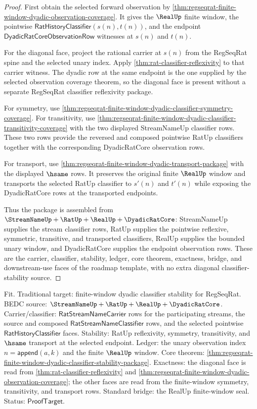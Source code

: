 \begin{proof}
First obtain the selected forward observation by
\autoref{thm:regseqrat-finite-window-dyadic-observation-coverage}. It gives
the $\RealUp$ finite window, the pointwise
$\mathsf{RatHistoryClassifier}(s(n),t(n))$, and the endpoint
$\mathsf{DyadicRatCoreObservationRow}$ witnesses at $s(n)$ and $t(n)$.

For the diagonal face, project the rational carrier at $s(n)$ from the
RegSeqRat spine and the selected unary index. Apply
\autoref{thm:rat-classifier-reflexivity} to that carrier witness. The dyadic
row at the same endpoint is the one supplied by the selected observation
coverage theorem, so the diagonal face is present without a separate
RegSeqRat classifier reflexivity package.

For symmetry, use
\autoref{thm:regseqrat-finite-window-dyadic-classifier-symmetry-coverage}.
For transitivity, use
\autoref{thm:regseqrat-finite-window-dyadic-classifier-transitivity-coverage}
with the two displayed StreamNameUp classifier rows. These two rows provide
the reversed and composed pointwise RatUp classifiers together with the
corresponding DyadicRatCore observation rows.

For transport, use
\autoref{thm:regseqrat-finite-window-dyadic-transport-package} with the
displayed $\hsame$ rows. It preserves the original finite $\RealUp$ window
and transports the selected RatUp classifier to $s'(n)$ and $t'(n)$ while
exposing the DyadicRatCore rows at the transported endpoints.

Thus the package is assembled from
$\StreamNameUp+\RatUp+\RealUp+\DyadicRatCore$: StreamNameUp supplies the
stream classifier rows, RatUp supplies the pointwise reflexive, symmetric,
transitive, and transported classifiers, RealUp supplies the bounded unary
window, and DyadicRatCore supplies the endpoint observation rows. These are
the carrier, classifier, stability, ledger, core theorem, exactness, bridge,
and downstream-use faces of the roadmap template, with no extra diagonal
classifier-stability source.
\end{proof}

Fit. Traditional target: finite-window dyadic classifier stability for
RegSeqRat. BEDC source:
$\StreamNameUp+\RatUp+\RealUp+\DyadicRatCore$. Carrier/classifier:
$\mathsf{RatStreamNameCarrier}$ rows for the participating streams, the source
and composed $\mathsf{RatStreamNameClassifier}$ rows, and the selected
pointwise $\mathsf{RatHistoryClassifier}$ faces. Stability: RatUp
reflexivity, symmetry, transitivity, and $\hsame$ transport at the selected
endpoint. Ledger: the unary observation index
$n=\mathsf{append}(a,k)$ and the finite $\RealUp$ window. Core theorem:
\autoref{thm:regseqrat-finite-window-dyadic-classifier-stability-package}.
Exactness: the diagonal face is read from
\autoref{thm:rat-classifier-reflexivity} and
\autoref{thm:regseqrat-finite-window-dyadic-observation-coverage}; the other
faces are read from the finite-window symmetry, transitivity, and transport
rows. Standard bridge: the RealUp finite-window seal. Status:
$\mathsf{ProofTarget}$.

